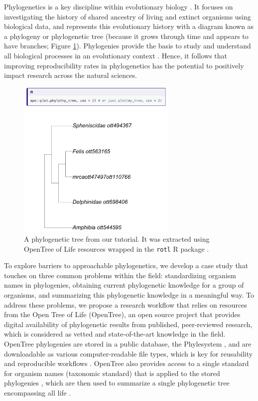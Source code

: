 \documentclass[12pt]{article}
\begin{document}
Phylogenetics is a key discipline within evolutionary biology \citep{dobzhansky1973nothing}.
It focuses on investigating the history of shared ancestry of living and extinct organisms using biological data, and represents this evolutionary history with a diagram known as a phylogeny or phylogenetic tree (because it grows through time and appears to have branches; Figure \ref{fig:tree}).
Phylogenies provide the basis to study and understand all biological processes in an evolutionary context \citep{dobzhansky1973nothing}.
Hence, it follows that improving reproducibility rates in phylogenetics has the potential to positively impact research across the natural sciences.

\begin{figure}
\begin{center}
\includegraphics[width=3in]{fig_tree.png}
\end{center}
\caption{A phylogenetic tree from our tutorial. It was extracted using OpenTree of Life resources \citep{opentreeoflife2019synth} wrapped in the \texttt{rotl} R package \citep{michonneau2016rotl}. \label{fig:tree}}
\end{figure}

To explore barriers to approachable phylogenetics, we develop a case study that touches on three common problems within the field: standardizing organism names in phylogenies, obtaining current phylogenetic knowledge for a group of organisms, and summarizing this phylogenetic knowledge in a meaningful way.
To address these problems, we propose a research workflow that relies on resources from the Open Tree of Life (OpenTree), an open source project that provides digital availability of phylogenetic results from published, peer-reviewed research, which is considered as vetted and state-of-the-art knowledge in the field.
OpenTree phylogenies are stored in a public database, the Phylesystem \citep{mctavish2015phylesystem}, and are downloadable as various computer-readable file types, which is key for reusability and reproducible workflows \citep{wilson2017good}.
OpenTree also provides access to a single standard for organism names (taxonomic standard) that is applied to the stored phylogenies \citep{rees2017automated}, which are then used to summarize a single phylogenetic tree encompassing all life \citep{opentreeoflife2019synth}.
\end{document}
